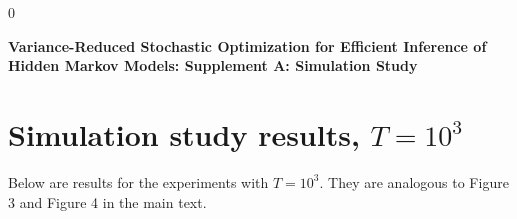 \documentclass[12pt]{article}
\newcommand{\blind}{0}
\begin{document}
\blind
{
  \bigskip
  \bigskip
  \bigskip
  \begin{center}
    {\LARGE\bf Variance-Reduced Stochastic Optimization for Efficient Inference of Hidden Markov Models: Supplement A: Simulation Study}
  \end{center}
  \medskip
} \fi


\newpage
{} %

\section{Simulation study results, $T = 10^{3}$}

Below are results for the experiments with $T=10^{3}$. They are analogous to Figure 3 and Figure 4 in the main text.
\end{document}

